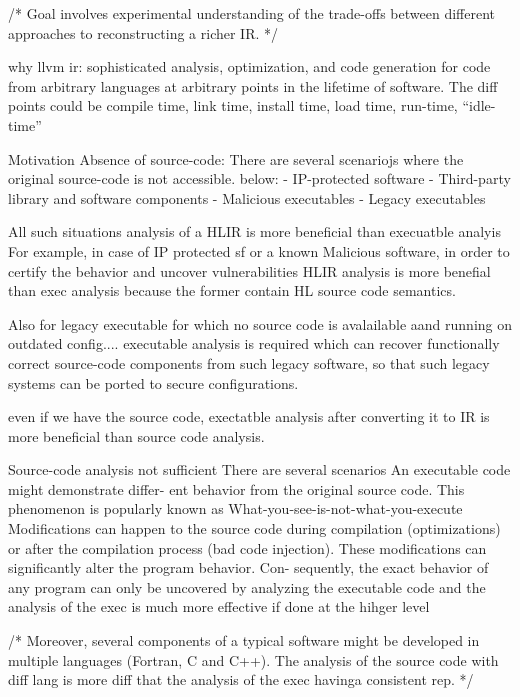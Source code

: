 \documentclass[mathserif,10pt]{beamer}
\begin{document}
{{    /*
       Goal involves experimental understanding of the trade-offs between
      different approaches to reconstructing a richer IR.
      */

    why llvm ir: 
      sophisticated analysis, optimization, and code generation for code from arbitrary languages
             at arbitrary points in the lifetime of software. The diff points could be 
             compile time, link time, install time, load time, run-time,
           “idle-time” 
    
  Motivation
  Absence of source-code: There are several scenariojs where the original
source-code is not accessible. 
below: 
  - IP-protected software 
  - Third-party library and software components
  - Malicious executables 
  - Legacy executables 

  All such situations analysis of a HLIR is more beneficial than execuatble analyis
  For example, in case of IP protected sf or a known Malicious software, 
  in order to certify the behavior and uncover vulnerabilities HLIR analysis is 
  more benefial than exec analysis because the former contain HL source code semantics.  
    
    Also for legacy executable for which no 
    source code is avalailable aand running on outdated config.... executable 
    analysis is required which can recover functionally correct
      source-code components from such legacy software, so that such legacy
      systems can be ported to secure configurations. 

  even if we have the source code, exectatble analysis after 
  converting it to IR is more beneficial than source code analysis.

  Source-code analysis not sufficient
    There are several scenarios An executable code might demonstrate differ- ent behavior from
    the original source code. This phenomenon is popularly known as
    What-you-see-is-not-what-you-execute 
    Modifications can happen to the source code during compilation
    (optimizations) or after the compilation process (bad code injection).
    These modifications can significantly alter the program behavior. Con-
    sequently, the exact behavior of any program can only be uncovered by
    analyzing the executable code and the analysis of the exec is much more effective if
    done at the hihger level

    /*
       Moreover, several components of a typical software might be developed in
    multiple languages (Fortran, C and C++). 
    The analysis of the source code with diff lang is more diff
    that the analysis of the exec havinga consistent rep.
  */

}}
\end{document}
